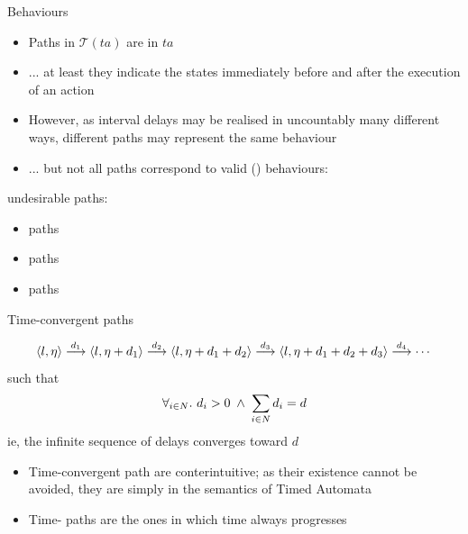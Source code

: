 \documentclass[aspectratio=169]{beamer}
\def\st{\mathbf{.}\,}
\def\TL#1{\mathcal{T}(#1)}
\begin{document}
\begin{slide}{Behaviours}
\small

\begin{itemize}
\item Paths in $\TL{ta}$ are  in $ta$
\item ... at least they indicate the states immediately before and after the execution of an action
\item However, as interval delays may be realised in \alert{uncountably} many different ways, different paths 
may represent the same behaviour
\pause
\item ... but not all paths correspond to valid  () behaviours:
\end{itemize}

\begin{block}{undesirable paths:}
\begin{itemize}
\item  {} paths
\item  {} paths
\item  {} paths
\end{itemize}
\end{block}
\end{slide}

\begin{slide}{Time-convergent paths}
\small

\begin{equation*}
\mathopen{\langle}l,\eta\mathclose{\rangle}  \stackrel{d_1}{\longrightarrow} \mathopen{\langle}l,\eta + d_1\mathclose{\rangle}  \stackrel{d_2}{\longrightarrow} \mathopen{\langle}l,\eta + d_1 + d_2\mathclose{\rangle}  \stackrel{d_3}{\longrightarrow} \mathopen{\langle}l,\eta + d_1 + d_2 + d_3\mathclose{\rangle}  \stackrel{d_4}{\longrightarrow} 
\cdots  
\end{equation*}
such that 
\begin{equation*}
\forall_{i \in N}\st\, d_i > 0\; \e\; \sum_{i \in N}  d_i = d
\end{equation*}
ie, the \alert{infinite sequence of delays converges toward $d$}

\begin{itemize}
\item Time-convergent path are \alert{conterintuitive}; as their existence cannot be avoided, they are simply   in the semantics of Timed Automata
\item Time- paths are the ones in which time always progresses
\end{itemize}
\end{slide}
\end{document}
